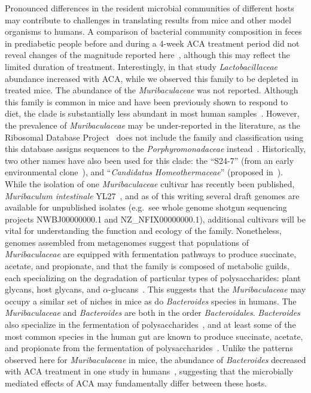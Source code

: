 \documentclass{doc/template/bmcart-nofigbox}
\newcommand{\frnlang}[1]{\textit{#1}}
\newcommand{\taxon}[1]{\frnlang{#1}}
\begin{document}
Pronounced differences in the resident microbial communities of different hosts
may contribute to challenges in translating results from mice and other model
organisms to humans.
A comparison of bacterial community composition in feces in prediabetic
people before and during a 4-week ACA treatment period did
not reveal changes of the magnitude reported here~\cite{Zhang2017}, although this may reflect
the limited duration of treatment.
Interestingly, in that study \taxon{Lactobacillaceae} abundance increased with ACA,
while we observed this family to be depleted in treated mice.
The abundance of the \taxon{Muribaculaceae} was not reported.
Although this family is common in mice
and have been previously shown to respond to diet,
the clade is substantially less abundant in most human samples~\cite{Ormerod2016}.
However, the prevalence of \taxon{Muribaculaceae} may be under-reported in the
literature, as the Ribosomal Database Project~\cite{Cole2014} does not include the
family and classification using this database assigns sequences to the
\taxon{Porphyromonadaceae} instead~\cite{Clavel2016}.
Historically, two other names have also been used for this clade: the ``S24-7''
(from an early environmental clone~\cite{Salzman2002}),
and ``\taxon{Candidatus Homeothermaceae}'' (proposed in~\cite{Ormerod2016}).
While the isolation of one \taxon{Muribaculaceae} cultivar has recently been
published, \taxon{Muribaculum intestinale} YL27~\cite{Lagkouvardos2016},
and as of this writing several draft genomes are available for unpublished
isolates (e.g.~see whole genome shotgun sequencing projects NWBJ00000000.1 and
NZ\_NFIX00000000.1),
additional cultivars will be vital for understanding the function and ecology
of the family.
Nonetheless, genomes assembled from metagenomes suggest that populations of
\taxon{Muribaculaceae} are equipped with fermentation pathways to produce succinate,
acetate, and propionate, and that the family is composed of metabolic guilds,
each specializing on the degradation of particular types of polysaccharides:
plant glycans, host glycans, and $\alpha$-glucans~\cite{Ormerod2016}.
This suggests that the \taxon{Muribaculaceae} may occupy a similar set of niches in
mice as do \taxon{Bacteroides} species in humans.
The \taxon{Muribaculaceae} and \taxon{Bacteroides} are both in the order
\taxon{Bacteroidales}.
\taxon{Bacteroides} also specialize in the fermentation of
polysaccharides~\cite{Wexler2007}, and at least some of the most common species in the human gut
are known to produce succinate, acetate, and propionate from the fermentation
of polysaccharides~\cite{Song2015, Macy1978, Macfarlane2003, Koh2016}.
Unlike the patterns observed here for \taxon{Muribaculaceae} in mice,
the abundance of \taxon{Bacteroides} decreased with ACA treatment in
one study in humans~\cite{Zhang2017}, suggesting that the microbially mediated
effects of ACA may fundamentally differ between these hosts.
\end{document}
